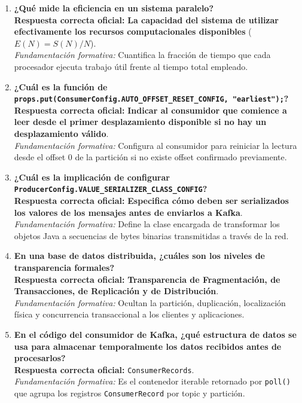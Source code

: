 \documentclass[11pt,a4paper]{article}
\begin{document}
\begin{enumerate}[label=\textbf{Pregunta \arabic*.}]
    \item \textbf{¿Qué mide la eficiencia en un sistema paralelo?}\\
    \textbf{Respuesta correcta oficial:} \textbf{La capacidad del sistema de utilizar efectivamente los recursos computacionales disponibles} ($E(N) = S(N)/N$).\\
    \textit{Fundamentación formativa:} Cuantifica la fracción de tiempo que cada procesador ejecuta trabajo útil frente al tiempo total empleado.

    \item \textbf{¿Cuál es la función de \texttt{props.put(\allowbreak{}ConsumerConfig.\allowbreak{}AUTO\_OFFSET\_RESET\_CONFIG,\allowbreak{} "earliest");}?}\\
    \textbf{Respuesta correcta oficial:} \textbf{Indicar al consumidor que comience a leer desde el primer desplazamiento disponible si no hay un desplazamiento válido}.\\
    \textit{Fundamentación formativa:} Configura al consumidor para reiniciar la lectura desde el offset 0 de la partición si no existe offset confirmado previamente.

    \item \textbf{¿Cuál es la implicación de configurar \texttt{ProducerConfig.\allowbreak{}VALUE\_SERIALIZER\_CLASS\_CONFIG}?}\\
    \textbf{Respuesta correcta oficial:} \textbf{Especifica cómo deben ser serializados los valores de los mensajes antes de enviarlos a Kafka}.\\
    \textit{Fundamentación formativa:} Define la clase encargada de transformar los objetos Java a secuencias de bytes binarias transmitidas a través de la red.

    \item \textbf{En una base de datos distribuida, ¿cuáles son los niveles de transparencia formales?}\\
    \textbf{Respuesta correcta oficial:} \textbf{Transparencia de Fragmentación, de Transacciones, de Replicación y de Distribución}.\\
    \textit{Fundamentación formativa:} Ocultan la partición, duplicación, localización física y concurrencia transaccional a los clientes y aplicaciones.

    \item \textbf{En el código del consumidor de Kafka, ¿qué estructura de datos se usa para almacenar temporalmente los datos recibidos antes de procesarlos?}\\
    \textbf{Respuesta correcta oficial:} \texttt{ConsumerRecords}.\\
    \textit{Fundamentación formativa:} Es el contenedor iterable retornado por \texttt{poll()} que agrupa los registros \texttt{ConsumerRecord} por topic y partición.


\end{enumerate}
\end{document}
